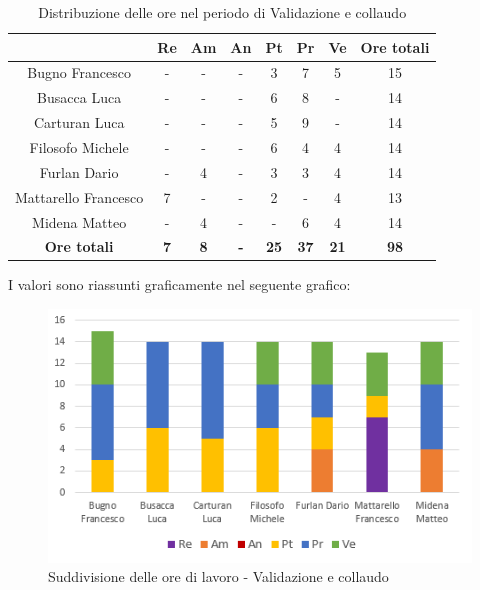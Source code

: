    \begin{table}[H]
       \centering
       \renewcommand{\arraystretch}{1.8}
       \begin{tabular}{c|c|c|c|c|c|c|c}
         \rowcolor[HTML]{125E28} 
         \multicolumn{1}{c}{\color[HTML]{FFFFFF}\textbf{ Nominativo }}
         & \multicolumn{1}{c}{\color[HTML]{FFFFFF}\textbf{ Re }}
         & \multicolumn{1}{c}{\color[HTML]{FFFFFF}\textbf{ Am}}
         & \multicolumn{1}{c}{\color[HTML]{FFFFFF}\textbf{ An }}
         & \multicolumn{1}{c}{\color[HTML]{FFFFFF}\textbf{ Pt }}
         & \multicolumn{1}{c}{\color[HTML]{FFFFFF}\textbf{ Pr }}
         & \multicolumn{1}{c}{\color[HTML]{FFFFFF}\textbf{ Ve }}
         & \multicolumn{1}{c}{\color[HTML]{FFFFFF}\textbf{ Ore totali }}\\
         \hline
         Bugno Francesco        & - & - & - & 3 & 7 & 5 & 15\\
         Busacca Luca           & - & - & - & 6 & 8 & - & 14\\
         Carturan Luca          & - & - & - & 5 & 9 & - & 14\\
         Filosofo Michele       & - & - & - & 6 & 4 & 4 & 14\\
         Furlan Dario           & - & 4 & - & 3 & 3 & 4 & 14\\
         Mattarello Francesco   & 7 & - & - & 2 & - & 4 & 13\\
         Midena Matteo          & - & 4 & - & - & 6 & 4 & 14\\
         \textbf{Ore totali} & \textbf{7} & \textbf{8} & \textbf{-} & \textbf{25} & \textbf{37} & \textbf{21} & \textbf{98}
       \end{tabular}
       \caption{Distribuzione delle ore nel periodo di Validazione e collaudo}
     \end{table}
   
   I valori sono riassunti graficamente nel seguente grafico:
   
   \begin{figure}[H]
       \centering
        \includegraphics[scale=1]{immagini/ore_lavoro_Validazione.png}
        \caption{Suddivisione delle ore di lavoro - Validazione e collaudo}
      \end{figure}
   

